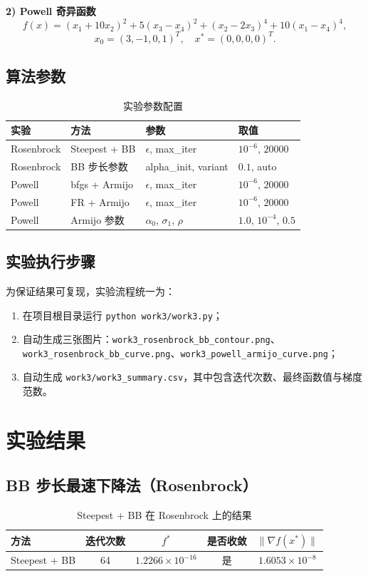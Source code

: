 \documentclass[12pt,a4paper]{ctexart}
\begin{document}
\textbf{2) Powell 奇异函数}
\begin{equation}
f(x)=(x_1+10x_2)^2+5(x_3-x_4)^2+(x_2-2x_3)^4+10(x_1-x_4)^4,
\end{equation}
\begin{equation}
x_0=(3,-1,0,1)^T,\quad x^\ast=(0,0,0,0)^T.
\end{equation}

\subsection{算法参数}
\begin{table}[H]
\centering
\caption{实验参数配置}
\label{tab:work3_params}
\begin{tabular}{llll}
\toprule
实验 & 方法 & 参数 & 取值 \\
\midrule
Rosenbrock & Steepest + BB & $\epsilon$, max\_iter & $10^{-6}$, $20000$ \\
Rosenbrock & BB 步长参数 & alpha\_init, variant & $0.1$, auto \\
Powell & bfgs + Armijo & $\epsilon$, max\_iter & $10^{-6}$, $20000$ \\
Powell & FR + Armijo & $\epsilon$, max\_iter & $10^{-6}$, $20000$ \\
Powell & Armijo 参数 & $\alpha_0$, $\sigma_1$, $\rho$ & $1.0$, $10^{-4}$, $0.5$ \\
\bottomrule
\end{tabular}
\end{table}

\subsection{实验执行步骤}
为保证结果可复现，实验流程统一为：
\begin{enumerate}
  \item 在项目根目录运行 \texttt{python work3/work3.py}；
  \item 自动生成三张图片：\texttt{work3\_rosenbrock\_bb\_contour.png}、\texttt{work3\_rosenbrock\_bb\_curve.png}、\texttt{work3\_powell\_armijo\_curve.png}；
  \item 自动生成 \texttt{work3/work3\_summary.csv}，其中包含迭代次数、最终函数值与梯度范数。
\end{enumerate}

\section{实验结果}
\subsection{BB 步长最速下降法（Rosenbrock）}
\begin{table}[H]
\centering
\caption{Steepest + BB 在 Rosenbrock 上的结果}
\label{tab:work3_bb_rosen}
\begin{tabular}{lcccc}
\toprule
方法 & 迭代次数 & $f^\ast$ & 是否收敛 & $\|\nabla f(x^\ast)\|$ \\
\midrule
Steepest + BB & 64 & $1.2266\times 10^{-16}$ & 是 & $1.6053\times 10^{-8}$ \\
\bottomrule
\end{tabular}
\end{table}
\end{document}
